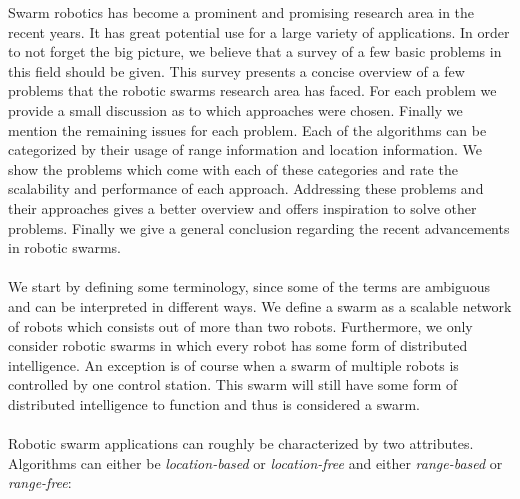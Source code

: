 



Swarm robotics has become a prominent and promising research area in the recent years. 
It has great potential use for a large variety of applications. 
In order to not forget the big picture, we believe that a survey of a few basic problems in this field should be given. 
This survey presents a concise overview of a few problems that the robotic swarms research area has faced. For each problem we provide a small discussion as to which approaches were chosen. 
Finally we mention the remaining issues for each problem. 
Each of the algorithms can be categorized by their usage of range information and location information. 
We show the problems which come with each of these categories and rate the scalability and performance of each approach. 
Addressing these problems and their approaches gives a better overview and offers inspiration to solve other problems.
Finally we give a general conclusion regarding the recent advancements in robotic swarms.  \\
\\
We start by defining some terminology, since some of the terms are ambiguous and can be interpreted in different ways.
We define a swarm as a scalable network of robots which consists out of more than two robots.
Furthermore, we only consider robotic swarms in which every robot has some form of distributed intelligence.
An exception is of course when a swarm of multiple robots is controlled by one control station.
This swarm will still have some form of distributed intelligence to function and thus is considered a swarm.  \\
\\
Robotic swarm applications can roughly be characterized by two attributes. Algorithms can either be \emph{location-based} or \emph{location-free} and either \emph{range-based} or \emph{range-free}:
